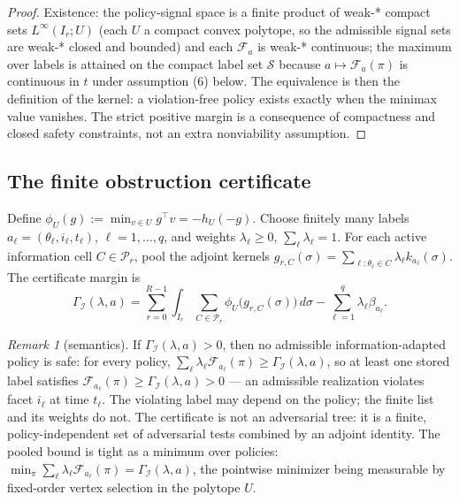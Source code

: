 \documentclass[10pt,twocolumn]{article}
\theoremstyle{plain}
\theoremstyle{definition}
\theoremstyle{remark}
\newtheorem{remark}[theorem]{Remark}
\begin{document}
\begin{proof}
Existence: the policy-signal space is a finite product of weak-*
compact sets \(L^\infty(I_r; U)\) (each \(U\) a compact convex
polytope, so the admissible signal sets are weak-* closed and bounded)
and each \(\mathcal{F}_a\) is weak-* continuous; the maximum over
labels is attained on the compact label set \(\mathscr{S}\) because
\(a \mapsto \mathcal{F}_a(\pi)\) is continuous in \(t\) under
assumption (6) below. The equivalence is then the definition of the
kernel: a violation-free policy exists exactly when the minimax value
vanishes. The strict positive margin is a consequence of compactness
and closed safety constraints, not an extra nonviability assumption.
\end{proof}

\subsection{The finite obstruction certificate}\label{certificate}

Define \(\phi_U(g) := \min_{v \in U} g^\top v = -h_U(-g)\). Choose finitely
many labels \(a_\ell = (\theta_\ell, i_\ell, t_\ell)\), \(\ell = 1,\dots,q\),
and weights \(\lambda_\ell \ge 0\), \(\sum_\ell \lambda_\ell = 1\). For each
active information cell \(C \in \mathcal{P}_r\), pool the adjoint kernels
\(g_{r,C}(\sigma) = \sum_{\ell : \theta_\ell \in C} \lambda_\ell
k_{a_\ell}(\sigma)\). The certificate margin is
\[
\Gamma_{\mathcal{I}}(\lambda, a)
= \sum_{r=0}^{R-1} \int_{I_r} \sum_{C \in \mathcal{P}_r}
\phi_U\!\bigl(g_{r,C}(\sigma)\bigr)\, d\sigma
- \sum_{\ell=1}^q \lambda_\ell \beta_{a_\ell}.
\tag{1}
\]

\begin{remark}[semantics]\label{rem:semantics}
If \(\Gamma_{\mathcal{I}}(\lambda, a) > 0\), then no admissible
information-adapted policy is safe: for every policy,
\(\sum_\ell \lambda_\ell \mathcal{F}_{a_\ell}(\pi) \ge
\Gamma_{\mathcal{I}}(\lambda, a)\), so at least one stored label satisfies
\(\mathcal{F}_{a_\ell}(\pi) \ge \Gamma_{\mathcal{I}}(\lambda, a) > 0\) ---
an admissible realization violates facet \(i_\ell\) at time \(t_\ell\). The
violating label may depend on the policy; the finite list and its weights do
not. The certificate is not an adversarial tree: it is a finite,
policy-independent set of adversarial tests combined by an adjoint identity.
The pooled bound is tight as a minimum over policies:
\(\min_{\pi} \sum_\ell \lambda_\ell \mathcal{F}_{a_\ell}(\pi) =
\Gamma_{\mathcal{I}}(\lambda, a)\), the pointwise minimizer being
measurable by fixed-order vertex selection in the polytope \(U\).
\end{remark}
\end{document}
